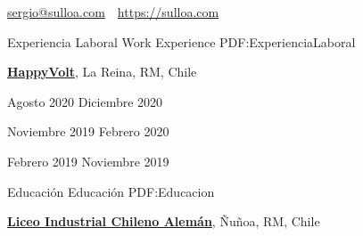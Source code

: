 \documentclass[letterpaper,yyyy,draft]{simpleresumecv}
\newcommand{\CVAuthor}{Sergio A. Ulloa B.}
\newcommand{\CVWebpage}{https://sulloa.com}
\begin{document}
\makeatletter
\let\@oddfoot\@empty{}
\let\@evenfoot\@empty{}
\makeatother

\Title{\CVAuthor}

{
    \begin{SubTitle}
    \href{mailto:sergio@sulloa.com}{sergio@sulloa.com}
    \,\SubBulletSymbol\,
    \href{\CVWebpage}{\url{\CVWebpage}}
    \end{SubTitle}
}

\begin{Body}


\Section
{Experiencia\newline
Laboral}
{Work Experience}
{PDF:ExperienciaLaboral}
{
    \Entry{}
    \href{https://happyvolt.com/}{\textbf{HappyVolt}},
    La Reina, RM, Chile

    \hfill
    Agosto 2020
    Diciembre 2020

    \hfill
    Noviembre 2019
    Febrero 2020

    \hfill
    Febrero 2019
    Noviembre 2019


    \begin{Detail}
    \end{Detail}


    \begin{Detail}
    \end{Detail}
}


\Section
{Educación}
{Educación}
{PDF:Educacion}
{
    \Entry{}
    \href{https://www.lichan.cl/}{\textbf{Liceo Industrial Chileno Alemán}},
    Ñuñoa, RM, Chile
    \hfill
     \-\- 



}
\end{Body}
\end{document}

